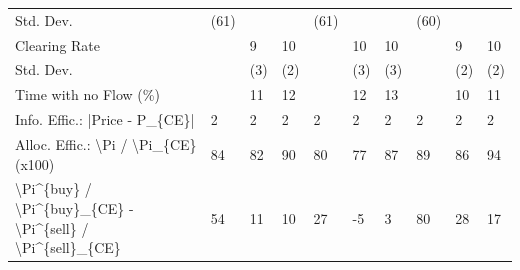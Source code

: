\begin{tabular}{llllllllll}
 Std. Dev.                                                 & (61)     &          &          & (61)     &          &          & (60)      &           &           \\
 Clearing Rate                                             &          & 9        & 10       &          & 10       & 10       &           & 9         & 10        \\
 Std. Dev.                                                 &          & (3)      & (2)      &          & (3)      & (3)      &           & (2)       & (2)       \\
 Time with no Flow (\%)                                     &          & 11       & 12       &          & 12       & 13       &           & 10        & 11        \\
 Info. Effic.: |Price - P\_\{CE\}|                            & 2        & 2        & 2        & 2        & 2        & 2        & 2         & 2         & 2         \\
 Alloc. Effic.: \textbackslash{}Pi / \textbackslash{}Pi\_\{CE\} (x100)                      & 84       & 82       & 90       & 80       & 77       & 87       & 89        & 86        & 94        \\
 \textbackslash{}Pi\^{}\{buy\} / \textbackslash{}Pi\^{}\{buy\}\_\{CE\} - \textbackslash{}Pi\^{}\{sell\} / \textbackslash{}Pi\^{}\{sell\}\_\{CE\} & 54       & 11       & 10       & 27       & -5       & 3        & 80        & 28        & 17        \\
\hline
\end{tabular}